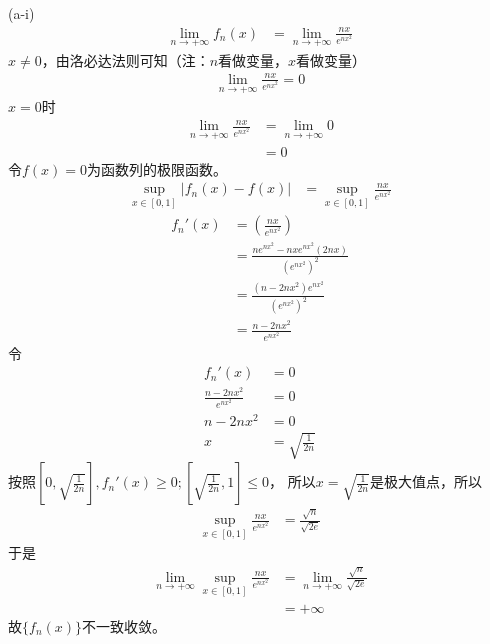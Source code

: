\documentclass{article}
\begin{document}
\begin{itemize}
        (a-i)
        \begin{align*}
          \lim\limits_{n \to +\infty} f_n(x)
           & = \lim\limits_{n \to +\infty} \frac{nx}{e^{nx^2}}
        \end{align*}
        $x \neq 0$，由洛必达法则可知（注：$n$看做变量，$x$看做变量）
        \begin{align*}
          \lim\limits_{n \to +\infty} \frac{nx}{e^{nx^2}} = 0
        \end{align*}
        $x = 0$时
        \begin{align*}
          \lim\limits_{n \to +\infty} \frac{nx}{e^{nx^2}}
           & = \lim\limits_{n \to +\infty} 0 \\
           & = 0
        \end{align*}
        令$f(x) = 0$为函数列的极限函数。
        \begin{align*}
          \sup\limits_{x \in [0, 1]} |f_n(x) - f(x)|
           & = \sup\limits_{x \in [0, 1]} \frac{nx}{e^{nx^2}}
        \end{align*}
        \begin{align*}
          f_n'(x) & = \left(\frac{nx}{e^{nx^2}} \right)                  \\
                  & = \frac{n e^{nx^2} - nx e^{nx^2}(2nx)}{(e^{nx^2})^2} \\
                  & = \frac{(n - 2nx^2) e^{nx^2}}{(e^{nx^2})^2}          \\
                  & = \frac{n - 2nx^2}{e^{nx^2}}
        \end{align*}
        令
        \begin{align*}
          f_n'(x)                    & = 0                   \\
          \frac{n - 2nx^2}{e^{nx^2}} & = 0                   \\
          n - 2nx^2                  & = 0                   \\
          x                          & = \sqrt{\frac{1}{2n}}
        \end{align*}
        按照$[0, \sqrt{\frac{1}{2n}}], f_n'(x) \geq 0; [\sqrt{\frac{1}{2n}}, 1] \leq 0$，
        所以$x = \sqrt{\frac{1}{2n}}$是极大值点，所以
        \begin{align*}
          \sup\limits_{x \in [0, 1]} \frac{nx}{e^{nx^2}}
           & = \frac{\sqrt{n}}{\sqrt{2 e}}
        \end{align*}
        于是
        \begin{align*}
          \lim\limits_{n \to +\infty} \sup\limits_{x \in [0, 1]} \frac{nx}{e^{nx^2}}
           & = \lim\limits_{n \to +\infty} \frac{\sqrt{n}}{\sqrt{2 e}} \\
           & = + \infty
        \end{align*}
        故$\{f_n(x)\}$不一致收敛。


\end{itemize}
\end{document}
